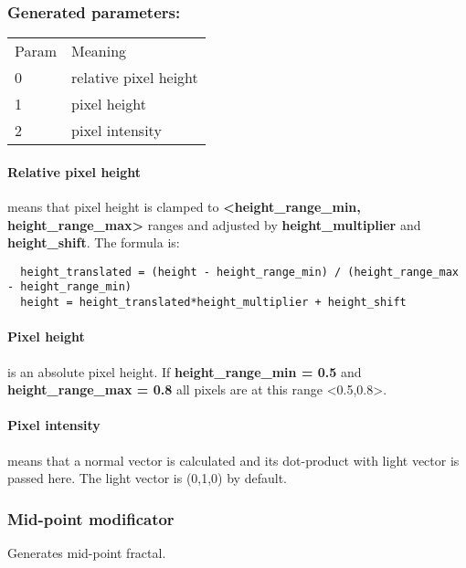 \documentclass[9pt]{article}
\begin{document}
\subsubsection*{Generated parameters:}

\begin{tabular}{|l||l|}
  Param & Meaning \\
  0 & relative pixel height \\
  1 & pixel height \\
  2 & pixel intensity \\
\end{tabular}

\paragraph*{Relative pixel height}
means that pixel height is clamped to {\bf<height\_range\_min, height\_range\_max>}
ranges and adjusted by {\bf height\_multiplier} and {\bf height\_shift}. 
The formula is:

\begin{verbatim}
  height_translated = (height - height_range_min) / (height_range_max - height_range_min)
  height = height_translated*height_multiplier + height_shift
\end{verbatim}

\paragraph*{Pixel height} is an absolute pixel height. 
If {\bf height\_range\_min = 0.5} and {\bf height\_range\_max = 0.8}
all pixels are at this range <0.5,0.8>.

\paragraph*{Pixel intensity} means that a normal vector is 
calculated and its dot-product with light vector 
is passed here. The light vector is (0,1,0) by default.

\subsubsection{Mid-point modificator}

Generates mid-point fractal.
\end{document}
